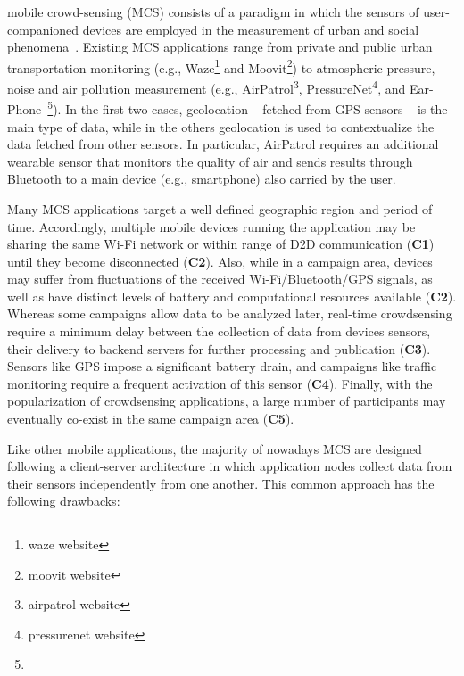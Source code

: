 mobile crowd-sensing (MCS) consists of a paradigm in which the sensors of user-companioned devices are employed in the measurement of urban and social phenomena~\cite{}. Existing MCS applications range from private and public urban transportation monitoring (e.g., Waze\footnote{waze website} and Moovit\footnote{moovit website}) to atmospheric pressure, noise and air pollution measurement (e.g., AirPatrol\footnote{airpatrol website}, PressureNet\footnote{pressurenet website}, and Ear-Phone~\footnote{}). In the first two cases, geolocation -- fetched from GPS sensors -- is the main type of data, while in the others geolocation is used to contextualize the data fetched from other sensors. In particular, AirPatrol requires an additional wearable sensor that monitors the quality of air and sends results through Bluetooth to a main device (e.g., smartphone) also carried by the user.

Many MCS applications target a well defined geographic region and period of time. Accordingly, multiple mobile devices running the application may be sharing the same Wi-Fi network or within range of D2D communication (\textbf{C1}) until they become disconnected (\textbf{C2}). Also, while in a campaign area, devices may suffer from fluctuations of the received Wi-Fi/Bluetooth/GPS signals, as well as have distinct levels of battery and computational resources available (\textbf{C2}).
Whereas some campaigns allow data to be analyzed later, real-time crowdsensing require a minimum delay between the collection of data from devices sensors, their delivery to backend servers for further processing and publication (\textbf{C3}). Sensors like GPS impose a significant battery drain, and campaigns like traffic monitoring require a frequent activation of this sensor (\textbf{C4}). Finally, with the popularization of crowdsensing applications, a large number of participants may eventually co-exist in the same campaign area (\textbf{C5}). 


Like other mobile applications, the majority of nowadays MCS are designed following a client-server architecture in which application nodes collect data from their sensors independently from one another. 
This common approach has the following drawbacks:

